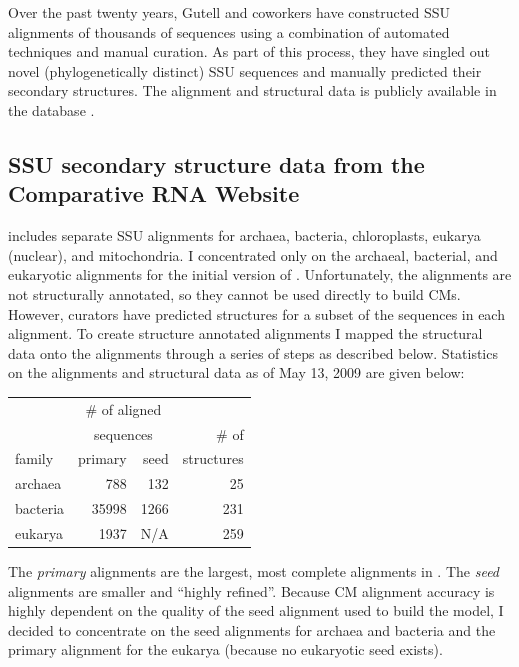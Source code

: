 Over the past twenty years, Gutell and coworkers have constructed SSU
alignments of thousands of sequences using a combination of automated
techniques and manual curation. As part of this process, they have
singled out novel (phylogenetically distinct) SSU sequences and
manually predicted their secondary structures. The alignment and
structural data is publicly available in the  database
\cite{CannoneGutell02}. 

\subsection{SSU secondary structure data from the Comparative RNA
  Website} 

 includes separate SSU alignments for archaea, bacteria,
chloroplasts, eukarya (nuclear), and mitochondria. I concentrated only
on the archaeal, bacterial, and eukaryotic alignments for the initial
version of .  Unfortunately, the  alignments
are not structurally annotated, so they cannot be used directly to
build CMs. However,  curators have predicted structures for a
subset of the sequences in each alignment.  To create structure
annotated alignments I mapped the structural data onto the alignments
through a series of steps as described below.  Statistics on the
 alignments and structural data as of May 13, 2009 are given
below:

\begin{center}
\begin{tabular}{l|rr|r}
       & \multicolumn{2}{c|}{\# of aligned}& \\
       & \multicolumn{2}{c|}{sequences}    & \# of \\ \cline {2-3}
family & primary & seed                   & structures \\ \hline
archaea&     788 &  132                   & 25 \\
bacteria&  35998 & 1266                   & 231 \\
eukarya&    1937 & N/A                    & 259 \\
\end{tabular}
\end{center}

The {\em primary} alignments are the largest, most complete alignments
in . The {\em seed} alignments are smaller and ``highly
refined''. Because CM alignment accuracy is highly dependent on the
quality of the seed alignment used to build the model, I decided to
concentrate on the seed alignments for archaea and bacteria and the
primary alignment for the eukarya (because no eukaryotic seed exists).

